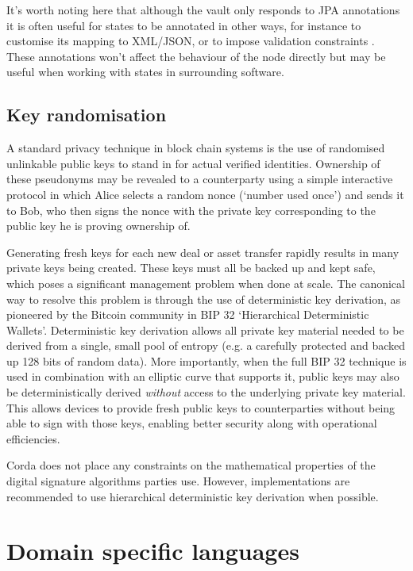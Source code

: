 \documentclass{article}
\begin{document}
It's worth noting here that although the vault only responds to JPA annotations it is often useful for states to be
annotated in other ways, for instance to customise its mapping to XML/JSON, or to impose validation constraints
\cite{BeanValidation}. These annotations won't affect the behaviour of the node directly but may be useful when working
with states in surrounding software.

\subsection{Key randomisation}\label{sec:key-randomisation}

A standard privacy technique in block chain systems is the use of randomised unlinkable public keys to stand in for
actual verified identities. Ownership of these pseudonyms may be revealed to a counterparty using a simple interactive
protocol in which Alice selects a random nonce (`number used once') and sends it to Bob, who then signs the nonce with
the private key corresponding to the public key he is proving ownership of.

Generating fresh keys for each new deal or asset transfer rapidly results in many private keys being created. These
keys must all be backed up and kept safe, which poses a significant management problem when done at scale. The canonical
way to resolve this problem is through the use of deterministic key derivation, as pioneered by the Bitcoin community in
BIP 32 `Hierarchical Deterministic Wallets'\cite{BIP32}. Deterministic key derivation allows all private key
material needed to be derived from a single, small pool of entropy (e.g. a carefully protected and backed up 128 bits of
random data). More importantly, when the full BIP 32 technique is used in combination with an elliptic curve that supports
it, public keys may also be deterministically derived \emph{without} access to the underlying private key material. This
allows devices to provide fresh public keys to counterparties without being able to sign with those keys, enabling
better security along with operational efficiencies.

Corda does not place any constraints on the mathematical properties of the digital signature algorithms parties use.
However, implementations are recommended to use hierarchical deterministic key derivation when possible.

\section{Domain specific languages}
\end{document}
